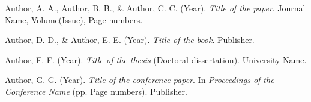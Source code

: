 \begin{thebibliography}{99}

Author, A. A., Author, B. B., \& Author, C. C. (Year). \textit{Title of the paper}. Journal Name, Volume(Issue), Page numbers.

Author, D. D., \& Author, E. E. (Year). \textit{Title of the book}. Publisher.

Author, F. F. (Year). \textit{Title of the thesis} (Doctoral dissertation). University Name.

Author, G. G. (Year). \textit{Title of the conference paper}. In \textit{Proceedings of the Conference Name} (pp. Page numbers). Publisher.

\end{thebibliography}
